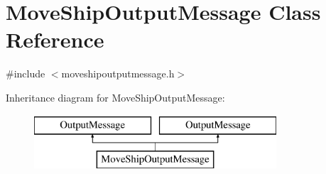 \hypertarget{class_move_ship_output_message}{}\section{Move\+Ship\+Output\+Message Class Reference}
\label{class_move_ship_output_message}


{\ttfamily \#include $<$moveshipoutputmessage.\+h$>$}

Inheritance diagram for Move\+Ship\+Output\+Message\+:\begin{figure}[H]
\begin{center}
\leavevmode
\includegraphics[height=2.000000cm]{d4/d9b/class_move_ship_output_message}
\end{center}
\end{figure}
